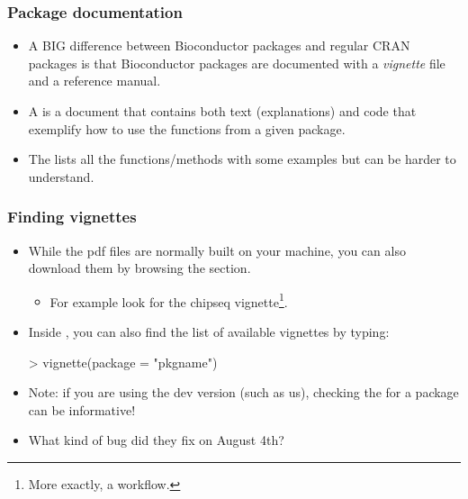 \begin{frame}[allowframebreaks]
  \frametitle{Package documentation}
  \begin{itemize}
  \item A \alert{BIG} difference between Bioconductor packages and regular CRAN packages is that Bioconductor packages are documented with a \emph{vignette} file and a reference manual.
  \item A  is a document that contains both text (explanations) and  code that exemplify how to use the functions from a given package.
  \item The  lists all the functions/methods with some examples but can be harder to understand.
  \end{itemize}
\end{frame}

\begin{frame}
  \frametitle{Finding vignettes}
  \begin{itemize}
  \item While the pdf files are normally built on your machine, you can also download them by browsing the  section.
  \begin{itemize}
  \item For example look  for the chipseq vignette\footnote{More exactly, a workflow.}.
  \end{itemize}
  \item Inside , you can also find the list of available vignettes by typing:
\begin{Schunk}
\begin{Sinput}
> vignette(package = "pkgname")
\end{Sinput}
\end{Schunk}
  \item \alert{Note:} if you are using the dev version (such as us), checking the  for a package can be informative!
  \item What kind of bug did they fix on August 4th?
  \end{itemize}
\end{frame}


